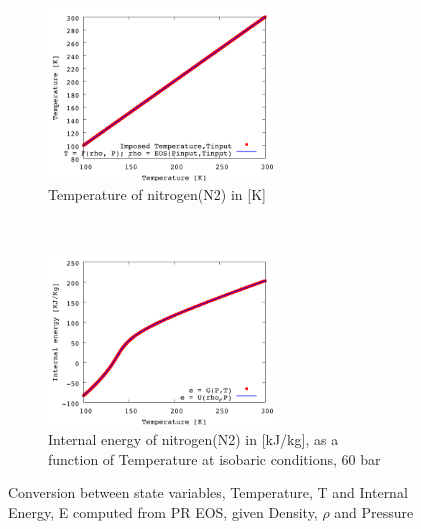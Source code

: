 \documentclass[11pt]{article}
\begin{document}
\begin{figure}[!tbh]
    \centering
    \begin{subfigure}[t]{0.5\textwidth}
        \centering
        \includegraphics[height=1.8in]{figures/N2_NonLinear_TfromRHO_P.png}
        \caption{Temperature of nitrogen(N2) in [K]}
        \end{subfigure}%
    ~ 
    \begin{subfigure}[t]{0.5\textwidth}
        \centering
        \includegraphics[height=1.8in]{figures/N2_NonLinear_EfromRHO_P.png}
        \caption{Internal energy of nitrogen(N2) in [kJ/kg], as a function of Temperature at isobaric conditions, 60 bar}
    \end{subfigure}
    \caption{Conversion between state variables, Temperature, T and Internal Energy, E computed from PR EOS, given Density, $\rho$ and Pressure}
    \label{fig:TEfromRHOP}
\end{figure}
\end{document}
